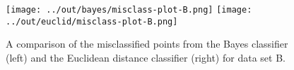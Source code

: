 \documentclass[headings=optiontoheadandtoc,listof=totoc,parskip=full]{scrartcl}
\begin{document}
\begin{figure}[H]
	\centering
	\texttt{[image: ../out/bayes/misclass-plot-B.png]}
	\texttt{[image: ../out/euclid/misclass-plot-B.png]}
	\caption{A comparison of the misclassified points from the Bayes classifier (left) and the Euclidean distance classifier (right) for data set B.}
	\label{fig:misclass-comparison-B}
\end{figure}
\end{document}
